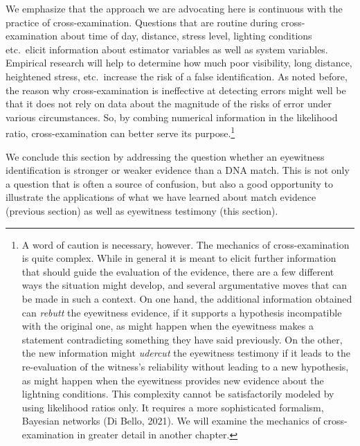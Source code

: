 \documentclass[
  10pt,
  dvipsnames,enabledeprecatedfontcommands]{scrartcl}
\begin{document}
We emphasize that the approach we are advocating here is continuous with
the practice of cross-examination. Questions that are routine during
cross-examination about time of day, distance, stress level, lighting
conditions etc.~elicit information about estimator variables as well as
system variables. Empirical research will help to determine how much
poor visibility, long distance, heightened stress, etc.~increase the
risk of a false identification. As noted before, the reason why
cross-examination is ineffective at detecting errors might well be that
it does not rely on data about the magnitude of the risks of error under
various circumstances. So, by combing numerical information in the
likelihood ratio, cross-examination can better serve its
purpose.\footnote{A word of caution is necessary, however. The mechanics
  of cross-examination is quite complex. While in general it is meant to
  elicit further information that should guide the evaluation of the
  evidence, there are a few different ways the situation might develop,
  and several argumentative moves that can be made in such a context. On
  one hand, the additional information obtained can \textit{rebutt} the
  eyewitness evidence, if it supports a hypothesis incompatible with the
  original one, as might happen when the eyewitness makes a statement
  contradicting something they have said previously. On the other, the
  new information might \textit{udercut} the eyewitness testimony if it
  leads to the re-evaluation of the witness's reliability without
  leading to a new hypothesis, as might happen when the eyewitness
  provides new evidence about the lightning conditions. This complexity
  cannot be satisfactorily modeled by using likelihood ratios only. It
  requires a more sophisticated formalism, Bayesian networks (Di Bello,
  2021). We will examine the mechanics of cross-examination in greater
  detail in another chapter.}

We conclude this section by addressing the question whether an
eyewitness identification is stronger or weaker evidence than a DNA
match. This is not only a question that is often a source of confusion,
but also a good opportunity to illustrate the applications of what we
have learned about match evidence (previous section) as well as
eyewitness testimony (this section).
\end{document}
